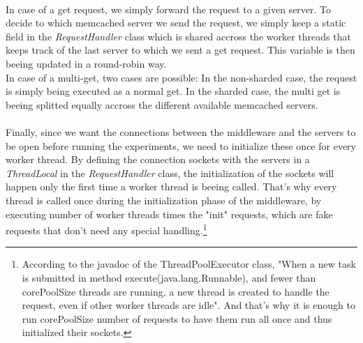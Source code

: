 \documentclass[11pt,a4paper]{article}
\begin{document}
\\
In case of a get request, we simply forward the request to a given server. To decide to which memcached server we send the request, we simply keep a static field in the \textit{RequestHandler} class which is shared accross the worker threads that keeps track of the last server to which we sent a get request. This variable is then beeing updated in a round-robin way. 
\\
In case of a multi-get, two cases are possible: In the non-sharded case, the request is simply being executed as a normal get. In the sharded case, the multi get is beeing splitted equally accross the different available memcached servers.   
\\\\
Finally, since we want the connections between the middleware and the servers to be open before running the experiments, we need to initialize these once for every worker thread. By defining the connection sockets with the servers in a \textit{ThreadLocal} in the \textit{RequestHandler} class, the initialization of the sockets will happen only the first time a worker thread is beeing called. That's why every thread is called once during the initialization phase of the middleware, by executing number of worker threads times the "init" requests, which are fake requests that don't need any special handling.\footnote{According to the javadoc of the ThreadPoolExecutor class, "When a new task is submitted in method execute(java.lang.Runnable), and fewer than corePoolSize threads are running, a new thread is created to handle the request, even if other worker threads are idle". And that's why it is enough to run corePoolSize number of requests to have them run all once and thus initialized their sockets.} 
\end{document}
